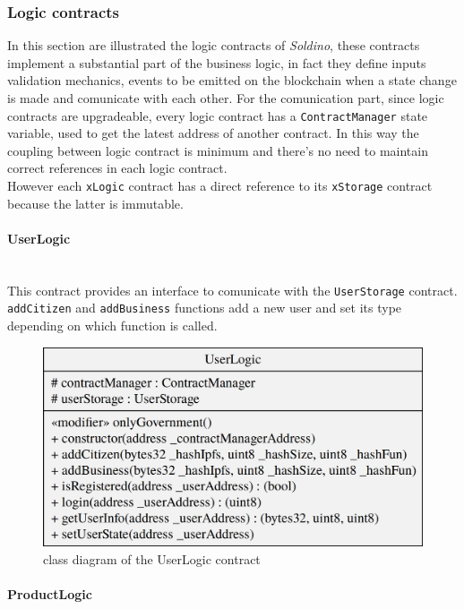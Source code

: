 \subsubsection{Logic contracts}
In this section are illustrated the logic contracts of \textit{Soldino}, these contracts implement a substantial part of the business logic, in fact they define inputs validation mechanics, events to be emitted on the blockchain when a state change is made and comunicate with each other.
For the comunication part, since logic contracts are upgradeable, every logic contract has a \texttt{ContractManager} state variable, used to get the latest address of another contract. In this way the coupling between logic contract is minimum and there's no need to maintain correct references in each logic contract.\\
However each \texttt{xLogic} contract has a direct reference to its \texttt{xStorage} contract because the latter is immutable.
\pagebreak
\paragraph{UserLogic}\mbox{}\\

\noindent This contract provides an interface to comunicate with the \texttt{UserStorage} contract. \texttt{addCitizen} and \texttt{addBusiness} functions add a new user and set its type depending on which function is called.
\begin{figure}[H]
	\centering
	\includegraphics[scale=0.20]{res/images/solidity/userlogic.png}
	\caption{class diagram of the UserLogic contract}
\end{figure}

\paragraph{ProductLogic}\mbox{}\\

